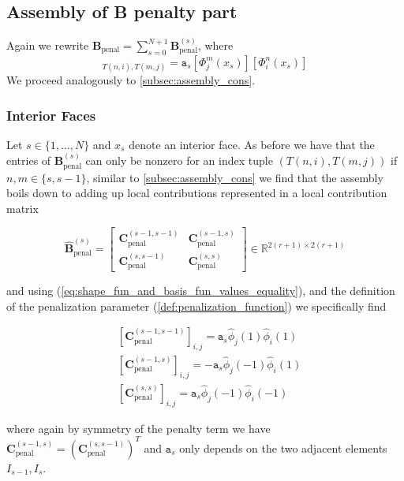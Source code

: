 \subsection{Assembly of B penalty part}
Again we rewrite $\textbf{B}_{\text{penal}} = \sum_{s=0}^{N+1} \textbf{B}_{\text{penal}}^{(s)}$, where
\begin{equation*}
	[\textbf{B}_{\text{penal}}^{(s)}]_{T(n,i), T(m,j)} = { \texttt{a}_s} [\Phi_j^m(x_s)] [\Phi_i^n(x_s)]
\end{equation*}
We proceed analogously to \ref{subsec:assembly_cons}.
\subsubsection{Interior Faces}
Let $s\in \{1,\ldots,N\} $ and $x_s$ denote an interior face. As before we have that
the entries of $ \textbf{B}_{\text{penal}}^{(s)} $ can only be nonzero for an index tuple
$ (T(n,i), T(m,j)) $ if $ n,m \in \{s, s-1\} $, similar to \ref{subsec:assembly_cons} we find
that the assembly boils down to adding up local contributions represented in a local contribution
matrix

\begin{equation*}
	\widehat{\textbf{B}}_{\text{penal}}^{(s)} =
	\begin{bmatrix}
		\textbf{C}_{\text{penal}}^{(s-1,s-1)} & \textbf{C}_{\text{penal}}^{(s-1,s)} \\
		\textbf{C}_{\text{penal}}^{(s,s-1)}   & \textbf{C}_{\text{penal}}^{(s,s)}
	\end{bmatrix}
	\in \mathbb{R}^{2(r+1) \times 2(r+1)}
\end{equation*}

and using (\ref{eq:shape_fun_and_basis_fun_values_equality}), and the definition of the penalization
parameter (\ref{def:penalization_function}) we specifically find

\begin{align*}
	 & [\textbf{C}_{\text{penal}}^{(s-1,s-1)}]_{i,j} = \texttt{a}_s \widehat{\phi}_j(1) \widehat{\phi}_i(1) \\
	 & [\textbf{C}_{\text{penal}}^{(s-1,s)}]_{i,j} = -\texttt{a}_s \widehat{\phi}_j(-1) \widehat{\phi}_i(1) \\
	 & [\textbf{C}_{\text{penal}}^{(s,s)}]_{i,j} = \texttt{a}_s \widehat{\phi}_j(-1) \widehat{\phi}_i(-1)
\end{align*}

where again by symmetry of the penalty term we have
$ \textbf{C}_{\text{penal}}^{(s-1,s)} = (\textbf{C}_{\text{penal}}^{(s,s-1)})^T$
and $\texttt{a}_s$ only depends on the two adjacent elements $I_{s-1}, I_s$.

